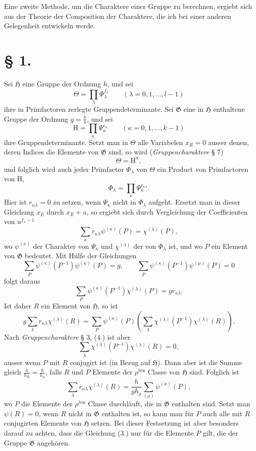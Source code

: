 \documentclass[11pt]{article}
\newcommand{\Hgr}{\mathfrak{H}}
\newcommand{\Ggr}{\mathfrak{G}}
\begin{document}
Eine zweite Methode, um die Charaktere einer Gruppe zu berechnen, ergiebt sich aus der Theorie der Composition der Charaktere, die ich bei einer anderen Gelegenheit entwickeln werde.

\section*{§ 1.}

Sei $\Hgr$ eine Gruppe der Ordnung $h$, und sei
\[
  \Theta=\prod_\lambda \Phi_\lambda^{f_\lambda}
  \qquad(\lambda=0,1,\ldots,l-1)
\]
ihre in Primfactoren zerlegte Gruppendeterminante. Sei $\Ggr$ eine in $\Hgr$ enthaltene Gruppe der Ordnung $g=\frac{h}{n}$, und sei
\[
  \mathrm H=\prod_\kappa \Psi_\kappa^{e_\kappa}
  \qquad(\kappa=0,1,\ldots,k-1)
\]
ihre Gruppendeterminante. Setzt man in $\Theta$ alle Variabelen $x_R=0$ ausser denen, deren Indices die Elemente von $\Ggr$ sind, so wird (\emph{Gruppencharaktere} § 7)
\[
\tag{1.}
  \Theta=\mathrm H^n,
\]
und folglich wird auch jeder Primfactor $\Phi_\lambda$ von $\Theta$ ein Product von Primfactoren von $\mathrm H$,
\[
\tag{2.}
  \Phi_\lambda=\prod_\kappa \Psi_\kappa^{r_{\kappa\lambda}}.
\]
Hier ist $r_{\kappa\lambda}=0$ zu setzen, wenn $\Psi_\kappa$ nicht in $\Phi_\lambda$ aufgeht. Ersetzt man in dieser Gleichung $x_E$ durch $x_E+u$, so ergiebt sich durch Vergleichung der Coefficienten von $u^{f_\lambda-1}$
\[
\tag{3.}
  \sum_\kappa r_{\kappa\lambda}\psi^{(\kappa)}(P)=\chi^{(\lambda)}(P),
\]
wo $\psi^{(\kappa)}$ der Charakter von $\Psi_\kappa$ und $\chi^{(\lambda)}$ der von $\Phi_\lambda$ ist, und wo $P$ ein Element von $\Ggr$ bedeutet. Mit Hülfe der Gleichungen
\[
  \sum_P \psi^{(\kappa)}(P^{-1})\psi^{(\kappa)}(P)=g,
  \qquad
  \sum_P \psi^{(\kappa)}(P^{-1})\psi^{(\mu)}(P)=0
\]
folgt daraus
\[
\tag{4.}
  \sum_P \psi^{(\kappa)}(P^{-1})\chi^{(\lambda)}(P)=g r_{\kappa\lambda}.
\]
Ist daher $R$ ein Element von $\Hgr$, so ist
\[
  g\sum_\lambda r_{\kappa\lambda}\chi^{(\lambda)}(R)
  =
  \sum_P\psi^{(\kappa)}(P)
  \left(\sum_\lambda \chi^{(\lambda)}(P^{-1})\chi^{(\lambda)}(R)\right).
\]
Nach \emph{Gruppencharaktere} § 3, (4.) ist aber
\[
  \sum_\lambda \chi^{(\lambda)}(P^{-1})\chi^{(\lambda)}(R)=0,
\]
ausser wenn $P$ mit $R$ conjugirt ist (in Bezug auf $\Hgr$). Dann aber ist die Summe gleich $\frac{h}{h_R}=\frac{h}{h_\rho}$, falls $R$ und $P$ Elemente der $\rho^{\mathrm{ten}}$ Classe von $\Hgr$ sind. Folglich ist
\[
\tag{5.}
  \sum_\lambda r_{\kappa\lambda}\chi^{(\lambda)}(R)
  =
  \frac{h}{g h_\rho}\sum_{(\rho)}\psi^{(\kappa)}(P),
\]
wo $P$ die Elemente der $\rho^{\mathrm{ten}}$ Classe durchläuft, die in $\Ggr$ enthalten sind. Setzt man $\psi(R)=0$, wenn $R$ nicht in $\Ggr$ enthalten ist, so kann man für $P$ auch alle mit $R$ conjugirten Elemente von $\Hgr$ setzen. Bei dieser Festsetzung ist aber besonders darauf zu achten, dass die Gleichung (3.) nur für die Elemente $P$ gilt, die der Gruppe $\Ggr$ angehören.
\end{document}

